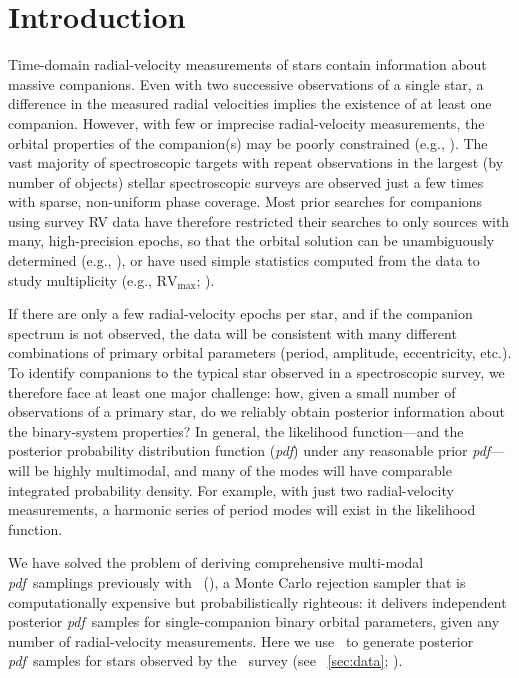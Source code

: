 \documentclass[modern, letterpaper]{aastex62}
\newcommand{\apogee}{\project{\acronym{APOGEE}}}
\newcommand{\thejoker}{\project{The~Joker}}
\newcommand{\pdf}{\textit{pdf}}
\begin{document}
\section{Introduction} \label{sec:intro}

Time-domain radial-velocity measurements of stars contain information about
massive companions.
Even with two successive observations of a single star, a difference in the
measured radial velocities implies the existence of at least one companion.
However, with few or imprecise radial-velocity measurements, the orbital
properties of the companion(s) may be poorly constrained (e.g.,
\citealt{Price-Whelan:2017}).
The vast majority of spectroscopic targets with repeat observations in the
largest (by number of objects) stellar spectroscopic surveys are observed just a
few times with sparse, non-uniform phase coverage.
Most prior searches for companions using survey RV data have therefore
restricted their searches to only sources with many, high-precision epochs, so
that the orbital solution can be unambiguously determined (e.g.,
\citealt{Troup:2016}), or have used simple statistics computed from the data to
study multiplicity (e.g., $\textrm{RV}_\textrm{max}$; \citealt{Badenes:2017}).

If there are only a few radial-velocity epochs per star, and if the companion
spectrum is not observed, the data will be consistent with many different
combinations of primary orbital parameters (period, amplitude, eccentricity,
etc.).
To identify companions to the typical star observed in a spectroscopic survey,
we therefore face at least one major challenge: how, given a small number of
observations of a primary star, do we reliably obtain posterior information
about the binary-system properties?
In general, the likelihood function---and the posterior probability distribution
function (\pdf) under any reasonable prior \pdf---will be highly multimodal, and
many of the modes will have comparable integrated probability density.
For example, with just two radial-velocity measurements, a harmonic series of
period modes will exist in the likelihood function.

We have solved the problem of deriving comprehensive multi-modal \pdf\ samplings
previously with \thejoker\ (\citealt{Price-Whelan:2017}), a Monte Carlo
rejection sampler that is computationally expensive but probabilistically
righteous:
it delivers independent posterior \pdf\ samples for single-companion binary
orbital parameters, given any number of radial-velocity measurements.
Here we use \thejoker\ to generate posterior \pdf\ samples for stars observed by
the \apogee\ survey (see \sectionname~\ref{sec:data}; \citealt{Majewski:2017}).
\end{document}
